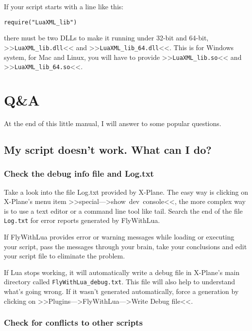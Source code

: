 \documentclass[11pt,parskip=half,a4paper]{scrartcl}
\begin{document}
If your script starts with a line like this:

\begin{lstlisting}[firstnumber=1]
require("LuaXML_lib")
\end{lstlisting}

there must be two DLLs to make it running under 32-bit and 64-bit, >>\verb|LuaXML_lib.dll|<< and >>\verb|LuaXML_lib_64.dll|<<. This is for Windows system, for Mac and Linux, you will have to provide >>\verb|LuaXML_lib.so|<< and >>\verb|LuaXML_lib_64.so|<<.

\newpage
\section{Q\&A}

At the end of this little manual, I will answer to some popular questions.

\subsection{My script doesn't work. What can I do?}

\subsubsection{Check the debug info file and Log.txt}

Take a look into the file Log.txt provided by X-Plane. The easy way is clicking on X-Plane's menu item >>special--->show~dev~console<<, the more complex way is to use a text editor or a command line tool like tail. Search the end of the file \verb|Log.txt| for error reports generated by FlyWithLua.

If FlyWithLua provides error or warning messages while loading or executing your script, pass the messages through your brain, take your conclusions and edit your script file to eliminate the problem.

If Lua stops working, it will automatically write a debug file in X-Plane's main directory called \verb|FlyWithLua_debug.txt|. This file will also help to understand what's going wrong. If it wasn't generated automatically, force a generation by clicking on >>Plugins--->FlyWithLua--->Write Debug file<<.

\subsubsection{Check for conflicts to other scripts}
\end{document}
